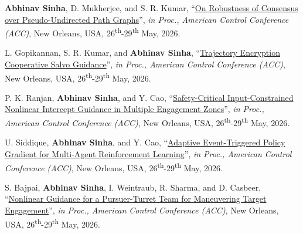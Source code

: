 {\begin{etaremune}[leftmargin=1cm]
		\item \textbf{Abhinav Sinha}, D. Mukherjee, and S. R. Kumar, ``\href{}{On Robustness of Consensus over Pseudo-Undirected Path Graphs}'', \emph{in Proc., American Control Conference (ACC)}, New Orleans, USA, 26\textsuperscript{th}-29\textsuperscript{th} May, 2026.
		\item L. Gopikannan, S. R. Kumar, and \textbf{Abhinav Sinha}, ``\href{}{Trajectory Encryption Cooperative Salvo Guidance}'', \emph{in Proc., American Control Conference (ACC)}, New Orleans, USA, 26\textsuperscript{th}-29\textsuperscript{th} May, 2026.
		\item P. K. Ranjan, \textbf{Abhinav Sinha}, and Y. Cao, ``\href{}{Safety-Critical Input-Constrained Nonlinear Intercept Guidance in Multiple Engagement Zones}'', \emph{in Proc., American Control Conference (ACC)}, New Orleans, USA, 26\textsuperscript{th}-29\textsuperscript{th} May, 2026.
		\item U. Siddique, \textbf{Abhinav Sinha}, and Y. Cao, ``\href{}{Adaptive Event-Triggered Policy Gradient for Multi-Agent Reinforcement Learning}'', \emph{in Proc., American Control Conference (ACC)}, New Orleans, USA, 26\textsuperscript{th}-29\textsuperscript{th} May, 2026.
		\item S. Bajpai, \textbf{Abhinav Sinha}, I. Weintraub, R. Sharma, and D. Casbeer, ``\href{}{Nonlinear Guidance for a Pursuer-Turret Team for Maneuvering Target Engagement}'', \emph{in Proc., American Control Conference (ACC)}, New Orleans, USA, 26\textsuperscript{th}-29\textsuperscript{th} May, 2026.		
		

\end{etaremune}}
